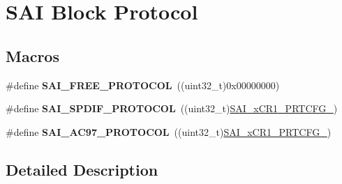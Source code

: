 \hypertarget{group___s_a_i___block___protocol}{}\section{S\+AI Block Protocol}
\label{group___s_a_i___block___protocol}
\subsection*{Macros}
\begin{DoxyCompactItemize}
\item 
\#define {\bfseries S\+A\+I\+\_\+\+F\+R\+E\+E\+\_\+\+P\+R\+O\+T\+O\+C\+OL}~((uint32\+\_\+t)0x00000000)\hypertarget{group___s_a_i___block___protocol_gabc5ad96f04226bf3b23c0b6cda9bdf35}{}\label{group___s_a_i___block___protocol_gabc5ad96f04226bf3b23c0b6cda9bdf35}

\item 
\#define {\bfseries S\+A\+I\+\_\+\+S\+P\+D\+I\+F\+\_\+\+P\+R\+O\+T\+O\+C\+OL}~((uint32\+\_\+t)\hyperlink{group___peripheral___registers___bits___definition_gaa7d920226316389ecf03b9854ddf9755}{S\+A\+I\+\_\+x\+C\+R1\+\_\+\+P\+R\+T\+C\+F\+G\+\_})\hypertarget{group___s_a_i___block___protocol_ga0daebcc4a92cd5e3e1854663b0cd739c}{}\label{group___s_a_i___block___protocol_ga0daebcc4a92cd5e3e1854663b0cd739c}

\item 
\#define {\bfseries S\+A\+I\+\_\+\+A\+C97\+\_\+\+P\+R\+O\+T\+O\+C\+OL}~((uint32\+\_\+t)\hyperlink{group___peripheral___registers___bits___definition_ga8714977ece0c80ddb952222a0923d81d}{S\+A\+I\+\_\+x\+C\+R1\+\_\+\+P\+R\+T\+C\+F\+G\+\_})\hypertarget{group___s_a_i___block___protocol_ga20ef961ccbd7993828f82c7599acd348}{}\label{group___s_a_i___block___protocol_ga20ef961ccbd7993828f82c7599acd348}

\end{DoxyCompactItemize}


\subsection{Detailed Description}
